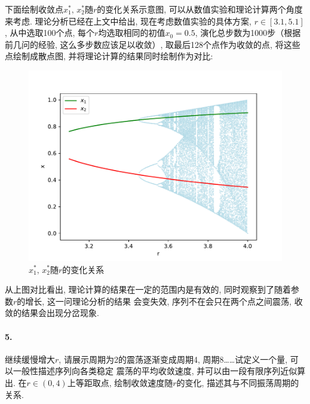 \documentclass[a4paper,zihao=5,UTF8]{ctexart}
\begin{document}
    \par 
    下面绘制收敛点$x_1^*,\,x_2^*$随$r$的变化关系示意图, 可以从数值实验和理论计算两个角度来考虑. 
    理论分析已经在上文中给出, 现在考虑数值实验的具体方案, $r\in[3.1, 5.1]$, 从中选取100个点, 
    每个$r$均选取相同的初值$x_0 = 0.5$, 演化总步数为1000步（根据前几问的经验, 这么多步数应该足以收敛）,
    取最后128个点作为收敛的点, 将这些点绘制成散点图, 并将理论计算的结果同时绘制作为对比: 
    \begin{figure}[htbp]
        \centering
        \includegraphics[scale=0.5]{4_1.pdf}
        \caption{$x_1^*,\,x_2^*$随$r$的变化关系}
    \end{figure}
    \par 
    从上图对比看出, 理论计算的结果在一定的范围内是有效的, 同时观察到了随着参数$r$的增长, 这一问理论分析的结果
    会变失效, 序列不在会只在两个点之间震荡, 收敛的结果会出现分岔现象.

    \paragraph{5.}
    继续缓慢增大$r$, 请展示周期为2的震荡逐渐变成周期4, 周期8……试定义一个量, 可以一般性描述序列向各类稳定
    震荡的平均收敛速度, 并可以由一段有限序列近似算出. 在$r\in(0, 4)$上等距取点, 绘制收敛速度随$r$的变化, 
    描述其与不同振荡周期的关系. 
\end{document}
